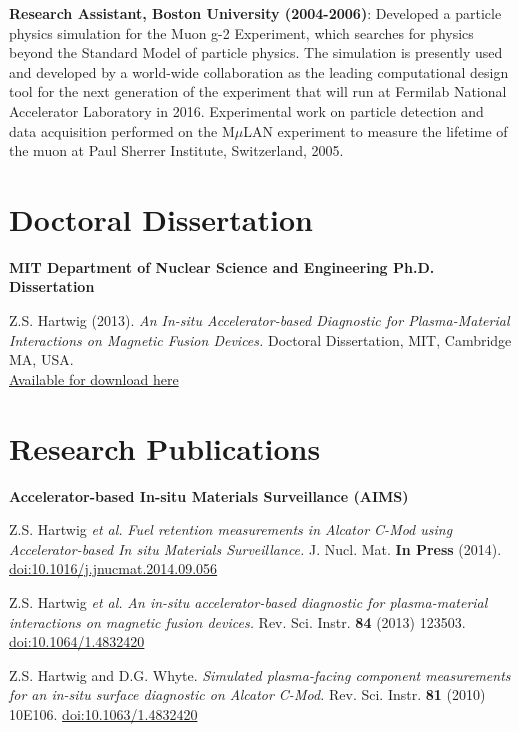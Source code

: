 \documentclass[10pt]{article}
\begin{document}
\begin{innerlist}
\item \textbf{Research Assistant, Boston University (2004-2006)}:
  Developed a particle physics simulation for the Muon g-2 Experiment,
  which searches for physics beyond the Standard Model of particle
  physics. The simulation is presently used and developed by a
  world-wide collaboration as the leading computational design tool
  for the next generation of the experiment that will run at Fermilab
  National Accelerator Laboratory in 2016. Experimental work on
  particle detection and data acquisition performed on the M$\mu$LAN
  experiment to measure the lifetime of the muon at Paul Sherrer
  Institute, Switzerland, 2005.
\end{innerlist}

\newpage
{}

\section{Doctoral Dissertation}
\textbf{MIT Department of Nuclear Science and Engineering Ph.D. Dissertation}
\begin{innerlist}
\item Z.S. Hartwig (2013). \textit{An In-situ Accelerator-based Diagnostic
  for Plasma-Material Interactions on Magnetic Fusion Devices.}
Doctoral Dissertation, MIT, Cambridge MA,
USA.\\ \href{http://www.psfc.mit.edu/library1/catalog/reports/2010/13rr/13rr012/13rr012_full.pdf}{Available
  for download here}
\end{innerlist}

\section{Research Publications}
\textbf{Accelerator-based In-situ Materials Surveillance (AIMS)}
\begin{innerlist}

\item Z.S. Hartwig \textit{et al.} \textit{Fuel retention measurements
  in Alcator C-Mod using Accelerator-based In situ Materials
  Surveillance.} J. Nucl. Mat. \textbf{In Press} (2014).
  \href{http://dx.doi.org/10.1016/j.jnucmat.2014.09.056}{doi:10.1016/j.jnucmat.2014.09.056}
  \vspace{0.2cm}

\item Z.S. Hartwig \textit{et al.} \textit{An in-situ
  accelerator-based diagnostic for plasma-material interactions on
  magnetic fusion devices.} Rev. Sci. Instr. \textbf{84} (2013)
  123503.
  \href{http://dx.doi.org/10.1063/1.4832420}{doi:10.1064/1.4832420}
  \vspace{0.2cm}

\item Z.S. Hartwig and D.G. Whyte. \textit{Simulated plasma-facing
  component measurements for an in-situ surface diagnostic on Alcator
  C-Mod.} Rev. Sci. Instr. \textbf{81} (2010)
  10E106.
  \href{http://dx.doi.org/10.1063/1.3478634}{doi:10.1063/1.4832420}
\end{innerlist}
\end{document}
